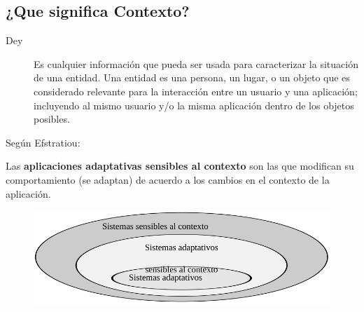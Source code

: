 \documentclass[
paper=128mm:96mm, %
fontsize=11pt, %
pagesize, %
parskip=half-, %
]{scrartcl} %
\theoremstyle{mythmstyle} %
\begin{document}



\subsection{¿Que significa Contexto?}
\begin{description}
\item[Dey\cite{Dey01}] Es cualquier información que pueda ser usada para caracterizar la situación de una entidad. Una entidad es una persona, un lugar, o un objeto que es considerado relevante para la interacción entre un usuario y una aplicación; incluyendo al mismo usuario y/o la misma aplicación dentro de los objetos posibles.
\end{description}

\clearpage

Según Efstratiou\cite{Efstratiou04}:

Las \textbf{aplicaciones adaptativas sensibles al contexto} son las que modifican su comportamiento (se adaptan) de acuerdo a los cambios en el contexto de la aplicación.

\begin{figure}[ht!]
\centering\includegraphics[width=0.8\linewidth]{../doc/Figures/ContextAwareSystems}
\end{figure}

\clearpage

%
\end{document}
